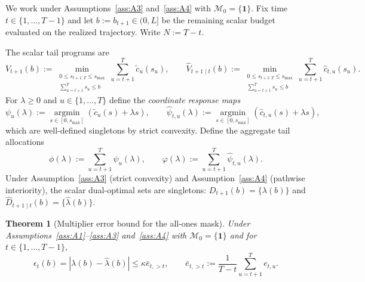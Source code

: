 \documentclass[11pt]{article}
\newtheorem{theorem}{Theorem}[section]
\newcommand{\1}{\mathbf{1}}
\newcommand{\mcal}{\mathcal{M}}
\newcommand{\argmin}{\operatorname*{argmin}}
\begin{document}
We work under Assumptions~\ref{ass:A3} and~\ref{ass:A4} with $\mcal_{0}=\{\1\}$.
Fix time $t \in \{1,\dots,T-1\}$ and let $b := b_{t+1} \in (0, L]$ be the remaining scalar budget evaluated on the realized trajectory.
Write $N := T-t$.

The scalar tail programs are
\begin{equation*}
  V_{t+1}(b)
  :=
  \min_{\substack{0 \leq s_{t+1:T} \leq s_{\max} \\
  \sum_{u=t+1}^{T} s_u \leq b}}
  \sum_{u=t+1}^{T} \tilde{c}_u(s_u),
  \qquad
  \hat{V}_{t+1 \mid t}(b)
  :=
  \min_{\substack{0 \leq s_{t+1:T} \leq s_{\max} \\
  \sum_{u=t+1}^{T} s_u \leq b}}
  \sum_{u=t+1}^{T} \hat{c}_{t,u}(s_u).
\end{equation*}
For $\lambda \geq 0$ and $u \in \{1,\dots,T\}$ define the \emph{coordinate response maps}
\begin{equation*}
  \psi_u(\lambda) := \argmin_{s \in [0,s_{\max}]} \left(\tilde{c}_u(s) + \lambda s\right),
  \qquad
  \hat{\psi}_{t,u}(\lambda) := \argmin_{s \in [0,s_{\max}]} \left(\hat{c}_{t,u}(s) + \lambda s\right),
\end{equation*}
which are well-defined singletons by strict convexity.
Define the aggregate tail allocations
\begin{equation*}
  \phi(\lambda) := \sum_{u=t+1}^{T} \psi_u(\lambda),
  \qquad
  \varphi(\lambda) := \sum_{u=t+1}^{T} \hat{\psi}_{t,u}(\lambda).
\end{equation*}
Under Assumption~\ref{ass:A3} (strict convexity) and Assumption~\ref{ass:A4} (pathwise interiority), the scalar dual-optimal sets are singletons:
$D_{t+1}(b) = \{\lambda(b)\}$ and $\hat{D}_{t+1 \mid t}(b) = \{\hat{\lambda}(b)\}$.

\begin{theorem}[Multiplier error bound for the all-ones mask]
  \label{thm:epsilon-all-ones}%
  Under Assumptions~\ref{ass:A1}--\ref{ass:A3} and~\ref{ass:A4} with $\mcal_{0}=\{\1\}$ and for $t \in \{1,\dots,T-1\}$,
  \begin{equation}
    \label{eq:epsilon-all-ones}
    \epsilon_t(b)
    = |\lambda(b)-\hat{\lambda}(b)|
    \leq \kappa \bar{e}_{t,>t},
    \qquad
    \bar{e}_{t,>t} := \frac{1}{T-t}\sum_{u=t+1}^{T} e_{t,u}.
  \end{equation}
\end{theorem}
\end{document}
